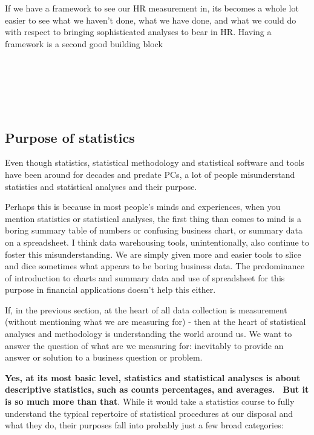 \documentclass[
]{article}
\begin{document}
If we have a framework to see our HR measurement in, its becomes a whole
lot easier to see what we haven't done, what we have done, and what we
could do with respect to bringing sophisticated analyses to bear in HR.
Having a framework is a second good building block

~

~

~

\subsection{\texorpdfstring{\textbf{Purpose of
statistics}}{Purpose of statistics}}\label{purpose-of-statistics}

Even though statistics, statistical methodology and statistical software
and tools have been around for decades and predate PCs, a lot of people
misunderstand statistics and statistical analyses and their purpose.

Perhaps this is because in most people's minds and experiences, when you
mention statistics or statistical analyses, the first thing than comes
to mind is a boring summary table of numbers or confusing business
chart, or summary data on a spreadsheet. I think data warehousing tools,
unintentionally, also continue to foster this misunderstanding. We are
simply given more and easier tools to slice and dice sometimes what
appears to be boring business data. The predominance of introduction to
charts and summary data and use of spreadsheet for this purpose in
financial applications doesn't help this either.

If, in the previous section, at the heart of all data collection is
measurement (without mentioning what we are measuring for) - then at the
heart of statistical analyses and methodology is understanding the world
around us. We want to answer the question of what are we measuring for:
inevitably to provide an answer or solution to a business question or
problem.

\textbf{Yes, at its most basic level, statistics and statistical
analyses is about descriptive statistics, such as counts percentages,
and averages.~ But it is so much more than that}. While it would take a
statistics course to fully understand the typical repertoire of
statistical procedures at our disposal and what they do, their purposes
fall into probably just a few broad categories:
\end{document}
